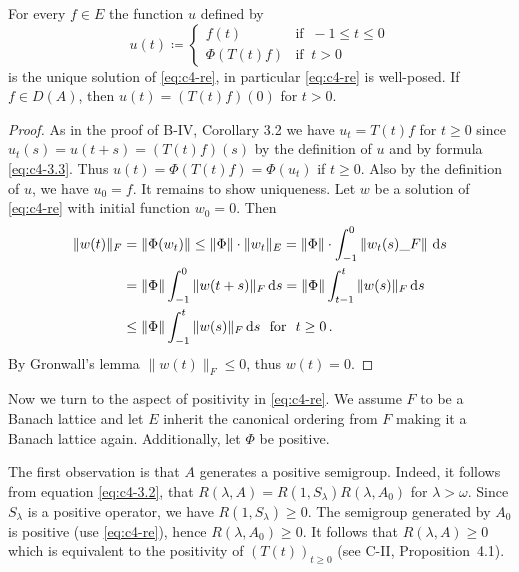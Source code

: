 \begin{corollary}\label{cor:c4-3.2}
%
%
%
For every $f \in E$ the function $u$ defined by
\begin{equation}\label{eq:c4-3.5}
u(t) \coloneqq  \begin{cases}
    f(t) & \text{if } \ -1 \leq t \leq 0 \\
    \Phi(T(t)f) & \text{if } \ t > 0
\end{cases}
\end{equation}
is the unique solution of \eqref{eq:c4-re}, in particular \eqref{eq:c4-re} is well-posed.
If $f \in D(A)$, then $u(t) = (T(t)f)(0)$ for $t > 0$.
\end{corollary}
\begin{proof}
As in the proof of B-IV, Corollary 3.2 we have $u_t = T(t)f$ for $t \geq 0$ since $u_t(s) = u(t+s) = (T(t)f)(s)$ by the definition of $u$ and by formula \eqref{eq:c4-3.3}.
Thus $u(t) = \Phi(T(t)f) = \Phi(u_t)$ if $t \geq 0$.
Also by the definition of $u$, we have $u_{0} = f$.
It remains to show uniqueness.
Let $w$ be a solution of \eqref{eq:c4-re} with initial function $w_{0} = 0$.
Then
\begin{align*}
\|w(t)\|_F & = \|\Phi(w_{t})\| \leq \|\Phi\| \cdot  \|w_{t}\|_{E} =  \|\Phi\| \cdot \int_{-1}^{0} \|w_{t}(s)\_{F}\| \, \mathop{}\!\mathrm{d}{s} \\
&=  \|\Phi\| \int_{-1}^0 \|w(t+s)\|_{F} \mathop{}\!\mathrm{d}{s} = \|\Phi\| \int_{t-1}^{t} \|w(s)\|_{F} \mathop{}\!\mathrm{d}{s} \\
&\leq \|\Phi\| \int_{-1}^{t} \|w(s)\|_{F} \mathop{}\!\mathrm{d}{s} \ \text{ for } \ t \geq 0\,.
\end{align*}
By Gronwall's lemma $\|w(t)\|_F \leq 0$, thus $w(t) = 0$.
\end{proof}
Now we turn to the aspect of positivity in \eqref{eq:c4-re}. We assume $F$ to be a Banach lattice and let $E$ inherit the canonical ordering from $F$ making it a Banach lattice again. Additionally, let $\Phi$ be positive.

The first observation is that $A$ generates a positive semigroup.
Indeed, it follows from equation \eqref{eq:c4-3.2}, that $R(\lambda,A) = R(1,S_\lambda)R(\lambda,A_{0})$ for $\lambda > \omega$. Since $S_\lambda$ is a positive operator, we have $R(1,S_\lambda) \geq 0$.
The semigroup generated by $A_{0}$ is positive (use \eqref{eq:c4-re}), hence $R(\lambda,A_{0}) \geq 0$.
It follows that $R(\lambda,A) \geq 0$ which is equivalent to the positivity of $(T(t))_{t \geq 0}$ (see C-II, Proposition~4.1).

